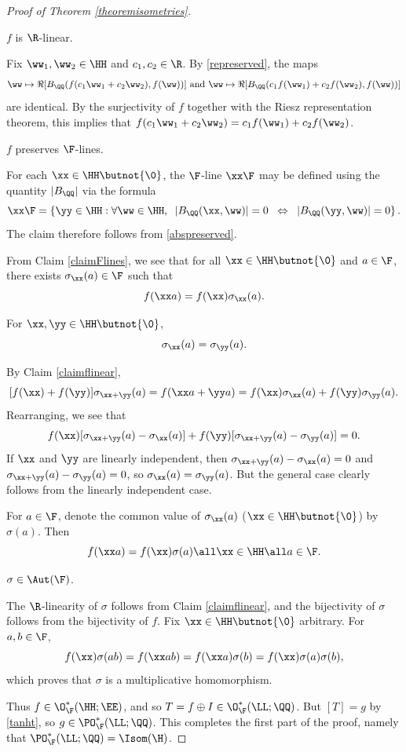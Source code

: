 \begin{proof}[Proof of Theorem \ref{theoremisometries}]
\begin{claim}
\label{claimflinear}
$f$ is $\R$-linear.
\end{claim}
\begin{subproof}
Fix $\ww_1,\ww_2\in\HH$ and $c_1,c_2\in\R$. By \eqref{represerved}, the maps
\[
\ww\mapsto \Re[B_\QQ(f(c_1\ww_1 + c_2\ww_2),f(\ww))] \text{ and } \ww\mapsto \Re[B_\QQ(c_1 f(\ww_1) + c_2 f(\ww_2),f(\ww))] 
\]
are identical. By the surjectivity of $f$ together with the Riesz representation theorem, this implies that $f(c_1\ww_1 + c_2\ww_2) = c_1 f(\ww_1) + c_2 f(\ww_2)$.
\end{subproof}
\begin{claim}
\label{claimFlines}
$f$ preserves $\F$-lines.
\end{claim}
\begin{subproof}
For each $\xx\in\HH\butnot\{\0\}$, the $\F$-line $\xx\F$ may be defined using the quantity $|B_\QQ|$ via the formula
\[
\xx\F = \left\{\yy\in\HH : \forall \ww\in \HH, \;\; |B_\QQ(\xx,\ww)| = 0 \;\;\Leftrightarrow\;\; |B_\QQ(\yy,\ww)| = 0\right\}.
\]
The claim therefore follows from \eqref{abspreserved}.
\end{subproof}
From Claim \ref{claimFlines}, we see that for all $\xx\in\HH\butnot\{\0\}$ and $a\in\F$, there exists $\sigma_\xx(a)\in\F$ such that
\[
f(\xx a) = f(\xx) \sigma_\xx(a).
\]
\begin{claim}
For $\xx,\yy\in\HH\butnot\{\0\}$,
\[
\sigma_\xx(a) = \sigma_\yy(a).
\]
\end{claim}
\begin{subproof}
By Claim \ref{claimflinear},
\[
[f(\xx) + f(\yy)] \sigma_{\xx + \yy}(a) = f(\xx a + \yy a) = f(\xx)\sigma_\xx(a) + f(\yy)\sigma_\yy(a).
\]
Rearranging, we see that
\[
f(\xx)[\sigma_{\xx + \yy}(a) - \sigma_\xx(a)] + f(\yy)[\sigma_{\xx + \yy}(a) - \sigma_\yy(a)] = 0.
\]
If $\xx$ and $\yy$ are linearly independent, then $\sigma_{\xx + \yy}(a) - \sigma_\xx(a) = 0$ and $\sigma_{\xx + \yy}(a) - \sigma_\yy(a) = 0$, so $\sigma_\xx(a) = \sigma_\yy(a)$. But the general case clearly follows from the linearly independent case.
\end{subproof}
For $a\in\F$, denote the common value of $\sigma_\xx(a)$ ($\xx\in\HH\butnot\{\0\}$) by $\sigma(a)$. Then
\begin{equation}
\label{fsigma}
f(\xx a) = f(\xx)\sigma(a) \all \xx\in\HH \all a\in\F.
\end{equation}
\begin{claim}
$\sigma\in\Aut(\F)$.
\end{claim}
\begin{subproof}
The $\R$-linearity of $\sigma$ follows from Claim \ref{claimflinear}, and the bijectivity of $\sigma$ follows from the bijectivity of $f$. Fix $\xx\in\HH\butnot\{\0\}$ arbitrary. For $a,b\in\F$,
\[
f(\xx)\sigma(ab) = f(\xx ab) = f(\xx a)\sigma(b) = f(\xx) \sigma(a)\sigma(b),
\]
which proves that $\sigma$ is a multiplicative homomorphism.
\end{subproof}
Thus $f\in\O_\F^*(\HH;\EE)$, and so $T = f\oplus I\in\O_\F^*(\LL;\QQ)$. But $[T] = g$ by \eqref{tanht}, so $g\in\PO_\F^*(\LL;\QQ)$. This completes the first part of the proof, namely that $\PO_\F^*(\LL;\QQ) = \Isom(\H)$.


\end{proof}
